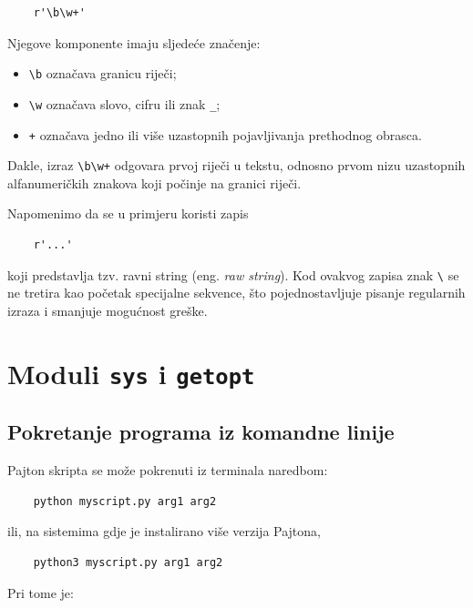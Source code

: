 \begin{verbatim}
	r'\b\w+'
\end{verbatim}

Njegove komponente imaju sljedeće značenje:

\begin{itemize}
	\item \texttt{\textbackslash b} označava granicu riječi;
	\item \texttt{\textbackslash w} označava slovo, cifru ili znak \texttt{\_};
	\item \texttt{+} označava jedno ili više uzastopnih pojavljivanja prethodnog obrasca.
\end{itemize}

Dakle, izraz \texttt{\textbackslash b\textbackslash w+} odgovara prvoj riječi u tekstu, odnosno prvom nizu uzastopnih alfanumeričkih znakova koji počinje na granici riječi.

Napomenimo da se u primjeru koristi zapis

\begin{verbatim}
	r'...'
\end{verbatim}

koji predstavlja tzv. ravni string (eng. \textit{raw string}). Kod ovakvog zapisa znak \texttt{\textbackslash} se ne tretira kao početak specijalne sekvence, što pojednostavljuje pisanje regularnih izraza i smanjuje mogućnost greške.

\section{Moduli \texttt{sys} i \texttt{getopt}}

\subsection*{Pokretanje programa iz komandne linije}

Pajton skripta se može pokrenuti iz terminala naredbom:

\begin{verbatim}
	python myscript.py arg1 arg2
\end{verbatim}

ili, na sistemima gdje je instalirano više verzija Pajtona,

\begin{verbatim}
	python3 myscript.py arg1 arg2
\end{verbatim}

Pri tome je:

